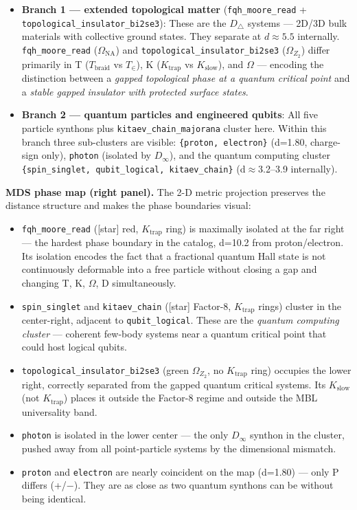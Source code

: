 \documentclass[12pt,a4paper]{article}
\begin{document}
\begin{itemize}
    \item \textbf{Branch 1 --- extended topological matter} (\texttt{fqh\_moore\_read} + \texttt{topological\_insulator\_bi2se3}): These are the $D_\triangle$ systems --- 2D/3D bulk materials with collective ground states. They separate at $d \approx 5.5$ internally. \texttt{fqh\_moore\_read} ($\Omega_{\text{NA}}$) and \texttt{topological\_insulator\_bi2se3} ($\Omega_{Z_2}$) differ primarily in T ($T_{\text{braid}}$ vs $T_{\in}$), K ($K_{\text{trap}}$ vs $K_{\text{slow}}$), and $\Omega$ --- encoding the distinction between a \emph{gapped topological phase at a quantum critical point} and a \emph{stable gapped insulator with protected surface states}.
    \item \textbf{Branch 2 --- quantum particles and engineered qubits}: All five particle synthons plus \texttt{kitaev\_chain\_majorana} cluster here. Within this branch three sub-clusters are visible: \texttt{\{proton, electron\}} (d=1.80, charge-sign only), \texttt{photon} (isolated by $D_{\infty}$), and the quantum computing cluster \texttt{\{spin\_singlet, qubit\_logical, kitaev\_chain\}} (d$\approx$3.2--3.9 internally).
\end{itemize}

\textbf{MDS phase map (right panel).} The 2-D metric projection preserves the distance structure and makes the phase boundaries visual:

\begin{itemize}
    \item \texttt{fqh\_moore\_read} ({[}star{]} red, $K_{\text{trap}}$ ring) is maximally isolated at the far right --- the hardest phase boundary in the catalog, d=10.2 from proton/electron. Its isolation encodes the fact that a fractional quantum Hall state is not continuously deformable into a free particle without closing a gap and changing T, K, $\Omega$, D simultaneously.
    \item \texttt{spin\_singlet} and \texttt{kitaev\_chain} ({[}star{]} Factor-8, $K_{\text{trap}}$ rings) cluster in the center-right, adjacent to \texttt{qubit\_logical}. These are the \emph{quantum computing cluster} --- coherent few-body systems near a quantum critical point that could host logical qubits.
    \item \texttt{topological\_insulator\_bi2se3} (green $\Omega_{Z_2}$, no $K_{\text{trap}}$ ring) occupies the lower right, correctly separated from the gapped quantum critical systems. Its $K_{\text{slow}}$ (not $K_{\text{trap}}$) places it outside the Factor-8 regime and outside the MBL universality band.
    \item \texttt{photon} is isolated in the lower center --- the only $D_{\infty}$ synthon in the cluster, pushed away from all point-particle systems by the dimensional mismatch.
    \item \texttt{proton} and \texttt{electron} are nearly coincident on the map (d=1.80) --- only P differs (+/$-$). They are as close as two quantum synthons can be without being identical.
\end{itemize}
\end{document}
